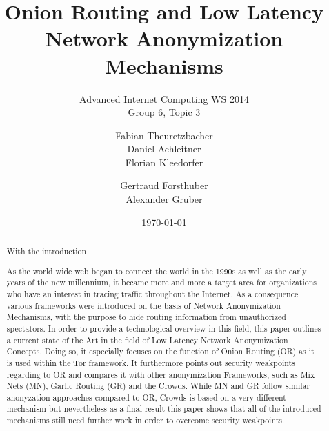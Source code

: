 \documentclass{sig-alternate}
\begin{document}
\title{Onion Routing and Low Latency Network Anonymization Mechanisms}
\subtitle{Advanced Internet Computing WS 2014 \\ Group 6, Topic 3}


\author{
\alignauthor
Fabian Theuretzbacher\\
\alignauthor
Daniel Achleitner\\
\alignauthor Florian Kleedorfer\\
\and  %
\alignauthor Gertraud Forsthuber\\
\alignauthor Alexander Gruber\\
\and
\and
{}
}

\date{\today}
\maketitle

\begin{abstract}

With the introduction

As the world wide web began to connect the world in the 1990s as well as the early years of the new millennium, it became more and more a target area for organizations who have an interest in tracing traffic throughout the Internet. As a consequence various frameworks were introduced on the basis of Network Anonymization Mechanisms, with the purpose to hide routing information from unauthorized spectators. In order to provide a technological overview in this field, this paper outlines a current state of the Art in the field of Low Latency Network Anonymization Concepts. Doing so, it especially focuses on the function of Onion Routing (OR) as it is used within the Tor framework. It furthermore points out security weakpoints regarding to OR and compares it with other anonymization Frameworks, such as Mix Nets (MN), Garlic Routing (GR) and the Crowds. While MN and GR follow similar anonyzation approaches compared to OR, Crowds is based on a very different mechanism but nevertheless as a final result this paper shows that all of the introduced mechanisms still need further work in order to overcome security weakpoints.

\end{abstract}
\end{document}
